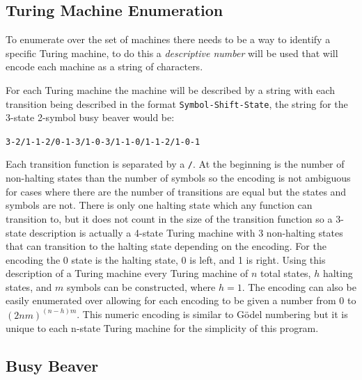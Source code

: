 \documentclass[journal,12pt,onecolumn,draftclsnofoot,]{IEEEtran}
\begin{document}
\subsection{Turing Machine Enumeration}

To enumerate over the set of machines there needs to be a way to identify a specific
Turing machine, to do this a \textit{descriptive number} will be used that will encode
each machine as a string of characters.~\cite{computable_numbers}

For each Turing machine the machine will be described by a string with each transition being
described in the format \verb|Symbol-Shift-State|, the string for the 3-state 
2-symbol 
busy beaver would be: 

\begin{center}
  {\verb|3-2/1-1-2/0-1-3/1-0-3/1-1-0/1-1-2/1-0-1|}
\end{center}

Each transition 
function is separated by a \verb|/|. At the beginning is the number of non-halting states than the number
of symbols so the encoding is not ambiguous for cases where there are the number of transitions
are equal but the states and symbols are not. There is only one halting 
state which any function can transition to, but it does not count in the size of the transition
function so a 3-state description is actually a 4-state Turing machine with 3 non-halting
states that can transition to the halting state depending on the encoding. For the encoding
the 0 state is the halting state, 0 is left, and 1 is right. Using this description of a 
Turing machine every Turing machine of $n$ total states, $h$ halting states, and $m$ symbols
can be constructed, where $h = 1$. The encoding can also be easily enumerated over allowing 
for each encoding to be given a number from 0 to ${(2nm)}^{(n-h)m}$. This numeric encoding
is similar to Gödel numbering but it is unique to each n-state Turing machine for the 
simplicity of this program.

\subsection{Busy Beaver}
\end{document}
